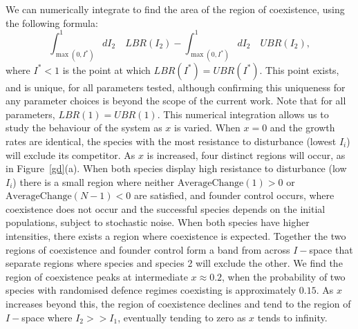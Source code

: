 We can numerically integrate to find the area of the region of coexistence, using the following formula:
\begin{equation}
\int_{\max(0,I^*)}^1 dI_2\quad LBR(I_2) - \int_{\max(0,I^*)}^1 dI_2\quad UBR(I_2),
\end{equation}
where $I^*<1$ is the point at which $LBR(I^*)=UBR(I^*)$. This point exists, and is unique, for all parameters tested, although confirming this uniqueness for any parameter choices is beyond the scope of the current work. Note that for all parameters, $LBR(1)=UBR(1)$. This numerical integration allows us to study the behaviour of the system as $x$ is varied. When $x=0$ and the growth rates are identical, the species with the most resistance to disturbance (lowest $I_i$) will exclude its competitor.  As $x$ is increased, four distinct regions will occur, as in Figure~\ref{gd}(a). When both species display high resistance to disturbance (low $I_i$) there is a small region where neither $\text{AverageChange}(1)>0$ or $\text{AverageChange}(N-1)<0$ are satisfied, and founder control occurs, where coexistence does not occur and the successful species depends on the initial populations, subject to stochastic noise. When both species have higher intensities, there exists a region where coexistence is expected. Together the two regions of coexistence and founder control form a band from across $I-$space that separate regions where species and species 2 will exclude the other. We find the region of coexistence peaks at intermediate $x \approx 0.2$, when the probability of two species with randomised defence regimes coexisting is approximately $0.15$. As $x$ increases beyond this, the region of coexistence declines and tend to the region of $I-$space where $I_2>>I_1$, eventually tending to zero as $x$ tends to infinity.

